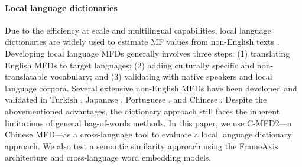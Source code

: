 \paragraph{Local language dictionaries}
Due to the efficiency at scale and multilingual capabilities, local language dictionaries are widely used to estimate MF values from non-English texts \citep{hopp2021extended}. Developing local language MFDs generally involves three steps: (1) translating English MFDs to target languages; (2) adding culturally specific and non-translatable vocabulary; and (3) validating with native speakers and local language corpora.  Several extensive non-English MFDs have been developed and validated in Turkish \citep{alper2020changes}, Japanese \citep{matsuo2019development}, Portuguese \citep{carvalho2020brazilian}, and Chinese \citep{cheng2023c}. Despite the abovementioned advantages, the dictionary approach still faces the inherent limitations of general bag-of-words methods. In this paper, we use C-MFD2---a Chinese MFD---as a cross-language tool to evaluate a local language dictionary approach. We also test a semantic similarity approach using the FrameAxis architecture and cross-language word embedding models. 




